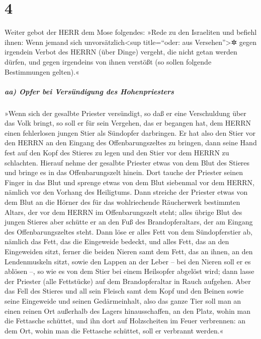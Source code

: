 \hypertarget{section-3}{%
\section{4}\label{section-3}}

Weiter gebot der HERR dem Mose folgendes:
»Rede zu den Israeliten und befiehl ihnen: Wenn jemand
sich unvorsätzlich\textless sup title=``oder: aus
Versehen''\textgreater✲ gegen irgendein Verbot des HERRN (über Dinge)
vergeht, die nicht getan werden dürfen, und gegen irgendeins von ihnen
verstößt (so sollen folgende Bestimmungen gelten).«

\hypertarget{aa-opfer-bei-versuxfcndigung-des-hohenpriesters}{%
\subparagraph{aa) Opfer bei Versündigung des
Hohenpriesters}\label{aa-opfer-bei-versuxfcndigung-des-hohenpriesters}}

»Wenn sich der gesalbte Priester versündigt, so daß er
eine Verschuldung über das Volk bringt, so soll er für sein Vergehen,
das er begangen hat, dem HERRN einen fehlerlosen jungen Stier als
Sündopfer darbringen. Er hat also den Stier vor den HERRN
an den Eingang des Offenbarungszeltes zu bringen, dann seine Hand fest
auf den Kopf des Stieres zu legen und den Stier vor dem HERRN zu
schlachten. Hierauf nehme der gesalbte Priester etwas von
dem Blut des Stieres und bringe es in das Offenbarungszelt hinein.
Dort tauche der Priester seinen Finger in das Blut und
sprenge etwas von dem Blut siebenmal vor dem HERRN, nämlich vor den
Vorhang des Heiligtums. Dann streiche der Priester etwas
von dem Blut an die Hörner des für das wohlriechende Räucherwerk
bestimmten Altars, der vor dem HERRN im Offenbarungszelt steht; alles
übrige Blut des jungen Stieres aber schütte er an den Fuß des
Brandopferaltars, der am Eingang des Offenbarungszeltes steht.
Dann löse er alles Fett von dem Sündopferstier ab, nämlich
das Fett, das die Eingeweide bedeckt, und alles Fett, das an den
Eingeweiden sitzt, ferner die beiden Nieren samt dem Fett,
das an ihnen, an den Lendenmuskeln sitzt, sowie den Lappen an der Leber
-- bei den Nieren soll er es ablösen --, so wie es von
dem Stier bei einem Heilsopfer abgelöst wird; dann lasse der Priester
(alle Fettstücke) auf dem Brandopferaltar in Rauch aufgehen.
Aber das Fell des Stieres und all sein Fleisch samt dem
Kopf und den Beinen sowie seine Eingeweide und seinen Gedärmeinhalt,
also das ganze Tier soll man an einen reinen Ort
außerhalb des Lagers hinausschaffen, an den Platz, wohin man die
Fettasche schüttet, und ihn dort auf Holzscheiten im Feuer verbrennen:
an dem Ort, wohin man die Fettasche schüttet, soll er verbrannt werden.«

